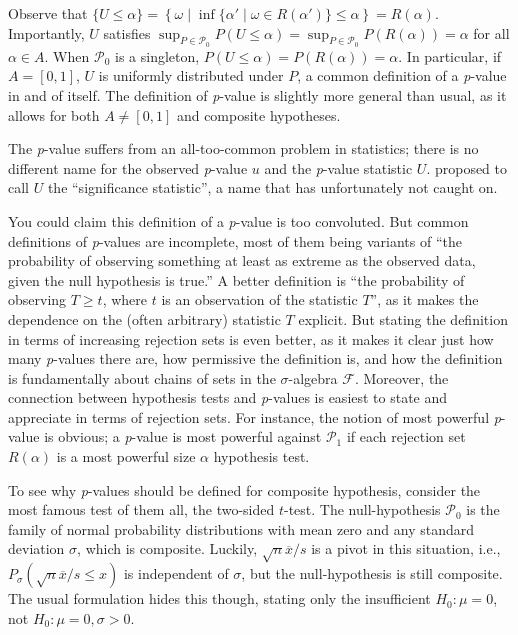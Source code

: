 Observe that $\{U\leq\alpha\}=\left\{ \omega\mid\inf\{\alpha'\mid\omega\in R(\alpha')\}\leq\alpha\right\}=R(\alpha)$.
Importantly, $U$ satisfies $\sup_{P\in\mathcal{P}_{0}}P(U\leq\alpha)=\sup_{P\in\mathcal{P}_{0}}P(R(\alpha))=\alpha$
for all $\alpha\in A$. When $\mathcal{P}_{0}$ is a singleton, $P(U\leq\alpha)=P(R(\alpha))=\alpha$.
In particular, if $A=[0,1]$, $U$ is uniformly distributed under $P$, a common definition of a \textit{p}-value in and of itself. The definition of \textit{p}-value is slightly more general than usual, as it allows for both $A\neq[0,1]$ and composite hypotheses. 

The \textit{p}-value suffers from an all-too-common problem in statistics; there is no different name for the observed \textit{p}-value $u$ and the \textit{p}-value statistic $U$. \textcite{Schweder1988-nh} proposed to call $U$ the ``significance statistic'', a name that has unfortunately not caught on. 

You could claim this definition of a \textit{p}-value is too convoluted. But common definitions of\emph{ p}-values are incomplete, most of them being variants of ``the probability of observing something at least as extreme as the observed data, given the null hypothesis is true.'' A better definition is ``the probability of observing $T\geq t$, where $t$ is an observation of the statistic $T$'', as it makes the dependence on the (often arbitrary) statistic $T$ explicit. But stating the definition in terms of increasing rejection sets is even better, as it makes it clear just how many \textit{p}-values there are, how permissive the definition is, and how the definition is fundamentally about chains of sets in the $\sigma$-algebra $\mathcal{F}$. Moreover, the connection between hypothesis tests and \textit{p}-values is easiest to state and appreciate in terms of rejection sets. For instance, the notion of most powerful \textit{p}-value is obvious; a \textit{p}-value is most powerful against $\mathcal{P}_{1}$ if each rejection set $R(\alpha)$ is a most powerful size $\alpha$ hypothesis test. 

To see why \textit{p}-values should be defined for composite hypothesis, consider the most famous test of them all, the two-sided $t$-test. The null-hypothesis $\mathcal{P}_{0}$ is the family of normal probability distributions with mean zero and any standard deviation $\sigma$, which is composite. Luckily, $\sqrt{n}\overline{x}/s$ is a pivot in this situation, i.e., $P_{\sigma}(\sqrt{n}\overline{x}/s\leq x)$ is independent of $\sigma$, but the null-hypothesis is still composite. The usual formulation hides this though, stating only the insufficient $H_0:\mu = 0$, not $H_0:\mu=0,\sigma>0$.

